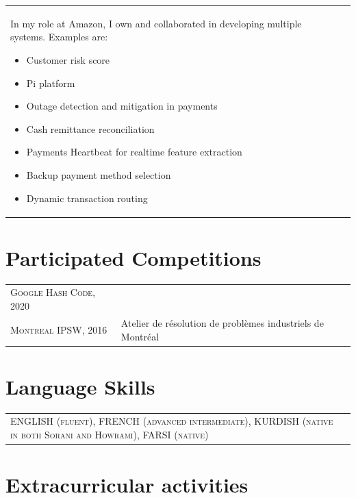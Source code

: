 \documentclass[10PT,letter]{article}
\newcommand{\numbox}[1]{} %
\begin{document}
\begin{tabular}{p{1.2in}p{5.55in}}
\begin{itemize}
												\end{itemize}
											In my role at Amazon,  I own and collaborated in developing multiple systems. Examples are:
											\begin{itemize}
												\item Customer risk score
												\item Pi platform
												\item Outage detection and mitigation in payments
												\item Cash remittance  reconciliation 
												\item Payments Heartbeat for realtime feature extraction
												\item Backup payment method selection
												\item Dynamic transaction routing
											\end{itemize}
												  \\[.5mm]
			\end{tabular}


\section*{\numbox{9}\bfseries\textcolor{titlecol}{\sffamily Participated Competitions}}
	\begin{tabular}{p{1.7in}p{5.55in}}
	\textsc{Google Hash Code, 2020} &    \\[.5mm]
	\textsc{Montreal IPSW, 2016} &  Atelier de résolution de problèmes industriels de Montréal 
	\\[.5mm]
\end{tabular}


\section*{\numbox{9}\bfseries\textcolor{titlecol}{\sffamily Language Skills}}

	\begin{tabular}{p{7.2in}p{5.55in}}
		\textsc{ENGLISH (fluent),   FRENCH (advanced intermediate),  KURDISH (native in both Sorani and Howrami), FARSI (native)} & \\[.5mm]
	\end{tabular}

\section*{\numbox{9}\bfseries\textcolor{titlecol}{\sffamily Extracurricular activities}}
\end{document}

